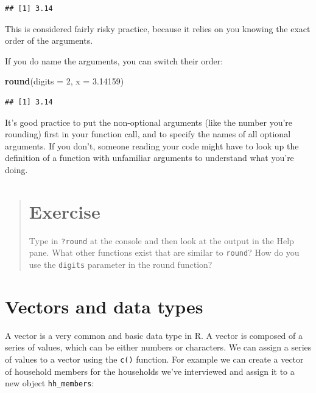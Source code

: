 \documentclass[]{book}
\newenvironment{Shaded}{\begin{snugshade}}{\end{snugshade}}
\newcommand{\KeywordTok}[1]{\textcolor[rgb]{0.13,0.29,0.53}{\textbf{#1}}}
\newcommand{\DataTypeTok}[1]{\textcolor[rgb]{0.13,0.29,0.53}{#1}}
\newcommand{\DecValTok}[1]{\textcolor[rgb]{0.00,0.00,0.81}{#1}}
\newcommand{\FloatTok}[1]{\textcolor[rgb]{0.00,0.00,0.81}{#1}}
\newcommand{\NormalTok}[1]{#1}
\begin{document}
\begin{verbatim}
## [1] 3.14
\end{verbatim}

This is considered fairly risky practice, because it relies on you
knowing the exact order of the arguments.

If you do name the arguments, you can switch their order:

\begin{Shaded}
\begin{Highlighting}[]
\KeywordTok{round}\NormalTok{(}\DataTypeTok{digits =} \DecValTok{2}\NormalTok{, }\DataTypeTok{x =} \FloatTok{3.14159}\NormalTok{)}
\end{Highlighting}
\end{Shaded}

\begin{verbatim}
## [1] 3.14
\end{verbatim}

It's good practice to put the non-optional arguments (like the number
you're rounding) first in your function call, and to specify the names
of all optional arguments. If you don't, someone reading your code might
have to look up the definition of a function with unfamiliar arguments
to understand what you're doing.

\begin{quote}
\section{Exercise}\label{exercise-3}

Type in \texttt{?round} at the console and then look at the output in
the Help pane. What other functions exist that are similar to
\texttt{round}? How do you use the \texttt{digits} parameter in the
round function?
\end{quote}

\section{Vectors and data types}\label{vectors-and-data-types}

A vector is a very common and basic data type in R. A vector is composed
of a series of values, which can be either numbers or characters. We can
assign a series of values to a vector using the \texttt{c()} function.
For example we can create a vector of household members for the
households we've interviewed and assign it to a new object
\texttt{hh\_members}:
\end{document}

